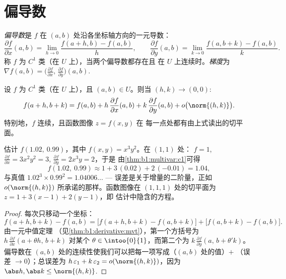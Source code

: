 \section{偏导数}

\begin{definition}\label{def:b1:multivar:partial}
\emph{偏导数}是 $f$ 在
$(a, b)$ 处沿各坐标轴方向的一元导数：
\[
\frac{\partial f}{\partial x}(a,b)
= \lim_{h \to 0} \frac{f(a + h, b) - f(a,b)}{h},
\qquad
\frac{\partial f}{\partial y}(a,b)
= \lim_{k \to 0} \frac{f(a, b + k) - f(a,b)}{k}.
\]
称 $f$ 为 $C^1$ 类（在 $U$ 上），当两个偏导数都存在且
在 $U$ 上连续时。\emph{梯度}为 $\nabla f(a,b) =
\bigl(\frac{\partial f}{\partial x},\, \frac{\partial f}{\partial
y}\bigr)(a,b)$.
\end{definition}

\begin{theorem}[$C^1$ 蕴含切平面]\label{thm:b1:multivar:c1}
设 $f$ 为 $C^1$ 类（在 $U$ 上），且 $(a,b) \in U$。则当 $(h, k) \to
(0,0)$:
\[
f(a + h, b + k) = f(a, b)
+ h\,\frac{\partial f}{\partial x}(a,b)
+ k\,\frac{\partial f}{\partial y}(a,b)
+ o\bigl(\norm{(h,k)}\bigr) .
\]
特别地，$f$ 连续，且函数图像 $z = f(x,y)$ 在
每一点处都有由上式读出的切平面。
\end{theorem}

\begin{example}[线性逼近的应用]
\label{ex:b1:multivar:linapprox}
估计 $f(1.02,\ 0.99)$，其中 $f(x, y) = x^3y^2$。在 $(1, 1)$ 处：
$f = 1$, $\frac{\partial f}{\partial x} = 3x^2y^2 = 3$,
$\frac{\partial f}{\partial y} = 2x^3y = 2$，于是
由\cref{thm:b1:multivar:c1}可得
\[
f(1.02,\ 0.99) \approx 1 + 3\,(0.02) + 2\,(-0.01) = 1.04 ,
\]
与真值 $1.02^3 \times 0.99^2 = 1.04006\dots$ ---
误差是关于增量的二阶量，正如
$o(\norm{(h,k)})$ 所承诺的那样。函数图像在
$(1, 1, 1)$ 处的切平面为 $z = 1 + 3(x - 1) + 2(y - 1)$，即
估计中隐含的方程。
\end{example}

\begin{proof}
每次只移动一个坐标：
\[
f(a+h, b+k) - f(a,b)
= \bigl[f(a+h, b+k) - f(a, b+k)\bigr] + \bigl[f(a, b+k) -
f(a,b)\bigr].
\]
由一元中值定理
（见\cref{thm:b1:derivative:mvt}），第一个方括号为 $h\,
\frac{\partial f}{\partial x}(a + \theta h,\, b + k)$ 对某个
$\theta \in \intoo{0}{1}$，而第二个为 $k\,\frac{\partial
f}{\partial y}(a,\, b + \theta' k)$。偏导数在
$(a,b)$ 处的连续性使我们可以把每一项写成（$(a,b)$ 处的值）$+$
（误差 $\to 0$）；总误差为 $h\,\varepsilon_1 +
k\,\varepsilon_2 = o(\norm{(h,k)})$，因为 $\abs h, \abs k \leq
\norm{(h,k)}$.
\end{proof}

